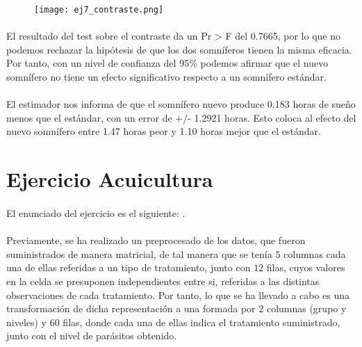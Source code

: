 \documentclass{article}
\begin{document}
    \begin{figure}[H]
      \centering
      \texttt{[image: ej7\_contraste.png]}
    \end{figure}

    \paragraph{}
    El resultado del test sobre el contraste da un Pr > F del 0.7665, por lo que no podemos rechazar la hipótesis de que los dos somníferos tienen la misma eficacia. Por tanto, con un nivel de confianza del 95\% podemos afirmar que el nuevo somnífero no tiene un efecto significativo respecto a un somnífero estándar.

    \paragraph{}
    El estimador nos informa de que el somnífero nuevo produce 0.183 horas de sueño menos que el estándar, con un error de +/- 1.2921 horas. Esto coloca al efecto del nuevo somnífero entre 1.47 horas peor y 1.10 horas mejor que el estándar.

  \section{Ejercicio Acuicultura}

    \paragraph{}
    El enunciado del ejercicio es el siguiente: .

    \paragraph{}
    Previamente, se ha realizado un preprocesado de los datos, que fueron suministrados de manera matricial, de tal manera que se tenía $5$ columnas cada una de ellas referidas a un tipo de tratamiento, junto con $12$ filas, cuyos valores en la celda se presuponen independientes entre si, referidas a las distintas observaciones de cada tratamiento. Por tanto, lo que se ha llevado a cabo es una transformación de dicha representación a una formada por $2$ columnas (grupo y niveles) y $60$ filas, donde cada una de ellas indica el tratamiento suministrado, junto con el nivel de parásitos obtenido.
\end{document}
